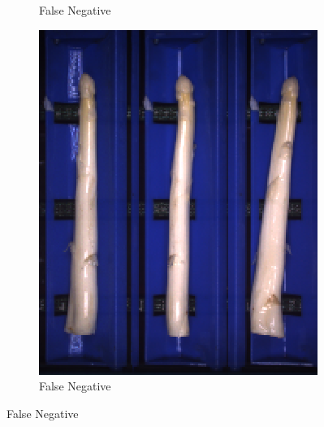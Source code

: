 \begin{figure}[h]
\begin{subfigure}{0.3\textwidth}
		\vspace{-5pt}
		\caption{False Negative}
	\end{subfigure}
	\begin{subfigure}{0.3\textwidth}
		\includegraphics[width=0.9\linewidth]{Figures/appendix/thin_falsenegative_03.png}
		\vspace{-5pt}
		\caption{False Negative}
	\end{subfigure}


\end{figure}
